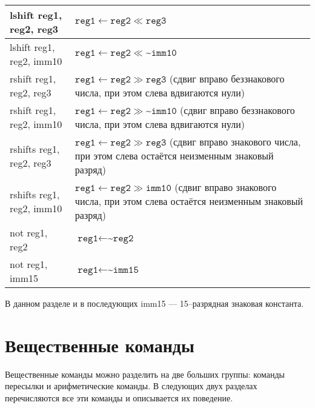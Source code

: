 \documentclass[10pt]{report}
\begin{document}
\begin{table}[!h]
\begin{tabular}{|l|p{11.35cm}|}
lshift reg1, reg2, reg3          & $\texttt{reg1}\leftarrow \texttt{reg2}\ll\texttt{reg3}$   \\ \hline
lshift reg1, reg2, imm10         & $\texttt{reg1}\leftarrow \texttt{reg2}\ll\text{\textasciitilde}\texttt{imm10}$   \\ \hline
rshift reg1, reg2, reg3          & $\texttt{reg1}\leftarrow \texttt{reg2}\gg\texttt{reg3}$ (сдвиг вправо беззнакового числа, при этом слева вдвигаются нули)  \\ \hline
rshift reg1, reg2, imm10         & $\texttt{reg1}\leftarrow \texttt{reg2}\gg\text{\textasciitilde}\texttt{imm10}$ (сдвиг вправо беззнакового числа, при этом слева вдвигаются нули)   \\ \hline
rshifts reg1, reg2, reg3         & $\texttt{reg1}\leftarrow \texttt{reg2}\gg\texttt{reg3}$ (сдвиг вправо знакового числа, при этом слева остаётся неизменным знаковый разряд)  \\ \hline
rshifts reg1, reg2, imm10        & $\texttt{reg1}\leftarrow \texttt{reg2}\gg\texttt{imm10}$ (сдвиг вправо знакового числа, при этом слева остаётся неизменным знаковый разряд)   \\ \hline
not reg1, reg2                   & $\texttt{reg1}\leftarrow \text{\textasciitilde}\texttt{reg2}$   \\ \hline
not reg1, imm15                  & $\texttt{reg1}\leftarrow \text{\textasciitilde}\texttt{imm15}$   \\ \hline
\end{tabular}
\end{table}

В данном разделе и в последующих imm15 --- 15--разрядная знаковая константа.

    \section{Вещественные команды}
Вещественные команды можно разделить на две больших группы: команды пересылки и арифметические команды. В следующих двух разделах перечисляются все эти команды и описывается их поведение.            
\end{document}
